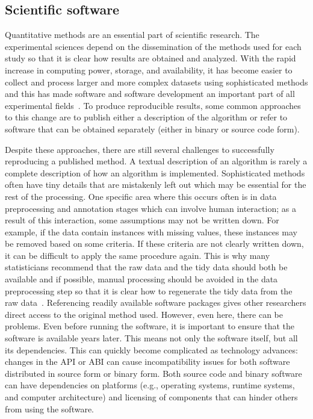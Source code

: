 \subsection{Scientific software}\label{subsec:sci-soft}
{ %
	Quantitative methods are an essential part of scientific research. The
	experimental sciences depend on the dissemination of the methods used for each
	study so that it is clear how results are obtained and analyzed.
	With the rapid increase in computing power, storage, and availability,
	it has become easier to collect and process larger and more complex datasets
	using sophisticated methods and this has made software and
	software development an important part of all experimental
	fields~\autocite{Baxter2006,SSI:hettrick_2014_14809}.
	To produce reproducible results, some common approaches to this change are
	to publish either a description of the algorithm or refer to software
	that can be obtained separately (either in binary or source code form).
}

Despite these approaches, there are still several challenges to successfully
reproducing a published method.
{ %
	A textual description of an algorithm is rarely a complete description of
	how an algorithm is implemented. Sophisticated methods often have tiny details
	that are mistakenly left out which may be essential for the rest of the
	processing. One specific area where this occurs often is
	in data preprocessing and annotation stages which can
	involve human interaction; as a result of this
	interaction, some assumptions
	may not be written down. For example, if the data contain
	instances with missing values, these instances may be removed based on
	some criteria. If these criteria are not clearly written
	down, it can be difficult to apply the same procedure
	again. This is why many statisticians recommend that the
	raw data and the tidy data should both be available and if
	possible, manual processing should be avoided in the data
	preprocessing step so that it is clear how to regenerate the
	tidy data from the raw data~\autocite{Sandve2013,datasharing:Leek,Jaffe2015,Wickham:tidy-data}.
}
{ %
	Referencing readily available software packages gives
	other researchers direct access to the original method
	used. However, even here, there can be problems.
	Even before running the software, it is important to
	ensure that the
	software is available years later. This means not only the software itself, but
	all its dependencies. This can quickly become complicated as technology
	advances: changes in the \acrfull{API} or \acrfull{ABI}
	can cause incompatibility issues for both software
	distributed in source form or binary form. Both source
	code and binary software can have dependencies on
	platforms (e.g., operating systems, runtime systems, and computer
	architecture) and licensing of components that can
	hinder others from using the software.
}

